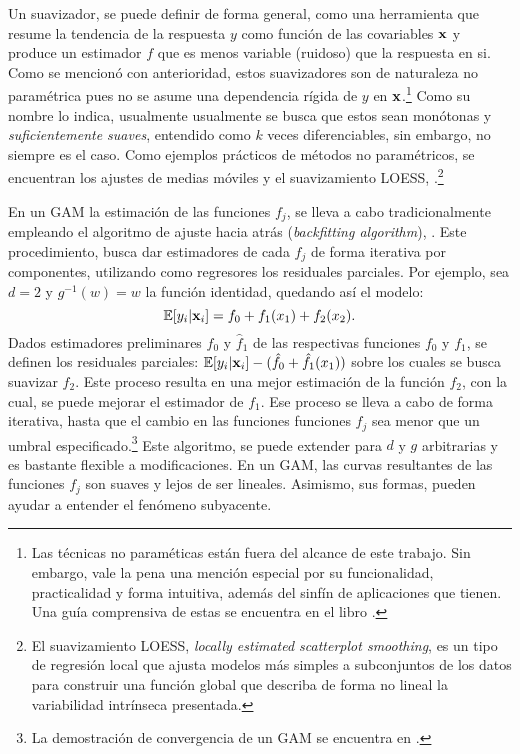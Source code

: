 \documentclass[../Main/Main.tex]{subfiles}
\begin{document}
Un suavizador, se puede definir de forma general, como una herramienta que resume la tendencia de la respuesta $y$ como función de las covariables $\mathbf{x}$ y produce un estimador $f$ que es menos variable (ruidoso) que la respuesta en si. Como se mencionó con anterioridad, estos suavizadores son de naturaleza no paramétrica pues no se asume una dependencia rígida de $y$ en $\mathbf{x}$.\footnote{Las técnicas no paraméticas están fuera del alcance de este trabajo. Sin embargo, vale la pena una mención especial por su funcionalidad, practicalidad y forma intuitiva, además del sinfín de aplicaciones que tienen. Una guía comprensiva de estas se encuentra en el libro \citet{wasserman2007all}.} Como su nombre lo indica, usualmente usualmente se busca que estos sean monótonas y \textit{suficientemente suaves}, entendido como $k$ veces diferenciables, sin embargo, no siempre es el caso. Como ejemplos prácticos de métodos no paramétricos, se encuentran los ajustes de medias móviles y el suavizamiento LOESS, \autocite{cleveland1988locally}.\footnote{El suavizamiento LOESS, \textit{locally estimated scatterplot smoothing}, es un tipo de regresión local que ajusta modelos más simples a subconjuntos de los datos para construir una función global que describa de forma no lineal la variabilidad intrínseca presentada.} 

En un GAM la estimación de las funciones $f_j$, se lleva a cabo tradicionalmente empleando el algoritmo de ajuste hacia atrás (\textit{backfitting algorithm}), \citet{hastie1986generalized}. Este procedimiento, busca dar estimadores de cada $f_j$ de forma iterativa por componentes, utilizando como regresores los residuales parciales. Por ejemplo, sea $d = 2$ y $g^{-1}(w) = w$ la función identidad, quedando así el modelo:
$$\mathbb{E}[y_i|\mathbf{x}_i] = f_0 + f_1(x_1) + f_2(x_2).$$
Dados estimadores preliminares $\hat{f}_0$ y $\hat{f}_1$ de las respectivas funciones $f_0$ y $f_1$, se definen los residuales parciales: $\mathbb{E}[y_i|\mathbf{x}_i] - (\hat{f}_0 + \hat{f}_1(x_1))$ sobre los cuales se busca suavizar $f_2$. Este proceso resulta en una mejor estimación de la función $f_2$, con la cual, se puede mejorar el estimador de $f_1$. Ese proceso se lleva a cabo de forma iterativa, hasta que el cambio en las funciones funciones $f_j$  sea menor que un umbral especificado.\footnote{La demostración de convergencia de un GAM se encuentra en \citet{stone1985additive}.} Este algoritmo, se puede extender para $d$ y $g$ arbitrarias y es bastante flexible a modificaciones. En un GAM, las curvas resultantes de las funciones $f_j$ son suaves y lejos de ser lineales. Asimismo, sus formas, pueden ayudar a entender el fenómeno subyacente. 
\end{document}
